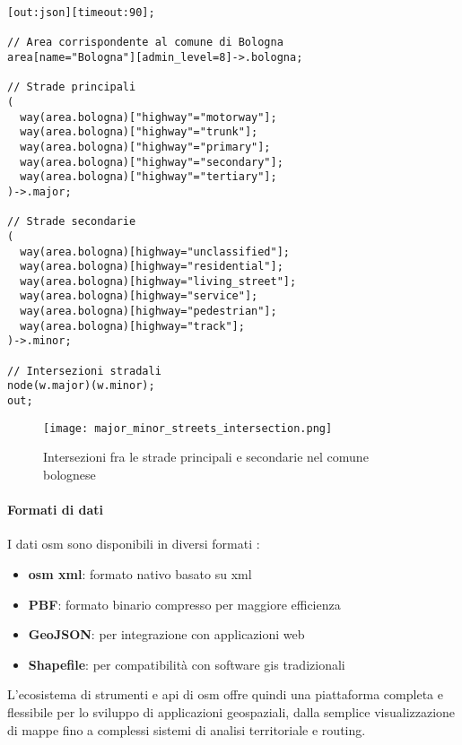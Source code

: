 \begin{lstlisting}[caption={Query in Overpass \acrshort{ql} di esempio}, label=lst:overpass-query]
[out:json][timeout:90];

// Area corrispondente al comune di Bologna
area[name="Bologna"][admin_level=8]->.bologna;

// Strade principali
(
  way(area.bologna)["highway"="motorway"];
  way(area.bologna)["highway"="trunk"];
  way(area.bologna)["highway"="primary"];
  way(area.bologna)["highway"="secondary"];
  way(area.bologna)["highway"="tertiary"];
)->.major;

// Strade secondarie
(
  way(area.bologna)[highway="unclassified"];
  way(area.bologna)[highway="residential"];
  way(area.bologna)[highway="living_street"];
  way(area.bologna)[highway="service"];
  way(area.bologna)[highway="pedestrian"];
  way(area.bologna)[highway="track"];
)->.minor;

// Intersezioni stradali
node(w.major)(w.minor);
out;
\end{lstlisting}

\begin{figure}[H]
  \centering
  \texttt{[image: major\_minor\_streets\_intersection.png]}
  \caption{Intersezioni fra le strade principali e secondarie nel comune bolognese}
  \label{fig:streets-intersections}
\end{figure}

\paragraph{Formati di dati}
I dati \acrshort{osm} sono disponibili in diversi formati \cite{geoapify2024}:
\begin{itemize}
  \item \textbf{\acrshort{osm} \acrshort{xml}}: formato nativo basato su \acrshort{xml}
  \item \textbf{PBF}: formato binario compresso per maggiore efficienza
  \item \textbf{GeoJSON}: per integrazione con applicazioni web
  \item \textbf{Shapefile}: per compatibilità con software \acrfull{gis} tradizionali
\end{itemize}

L'ecosistema di strumenti e \acrshort{api} di \acrfull{osm} offre quindi una piattaforma completa e flessibile per lo
sviluppo di applicazioni geospaziali, dalla semplice visualizzazione di mappe fino a complessi sistemi
di analisi territoriale e routing.

